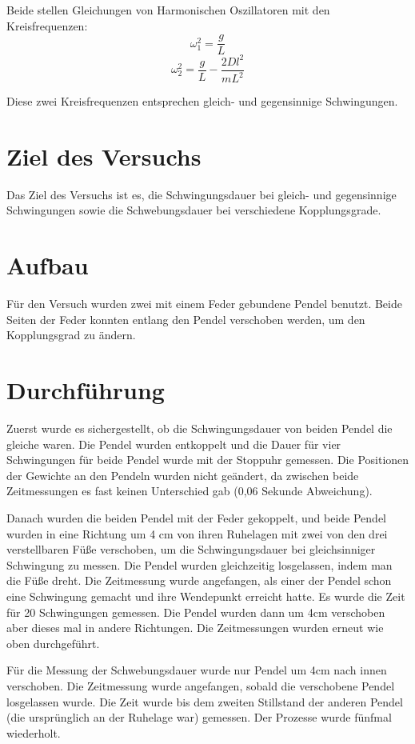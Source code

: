 \documentclass[11pt,a4paper]{article}
\begin{document}
Beide stellen Gleichungen von Harmonischen Oszillatoren mit den Kreisfrequenzen:
$$ \omega_1^2 = \frac{g}{L}$$
$$ \omega_2^2 = \frac{g}{L}-\frac{2Dl^2}{mL^2} $$

Diese zwei Kreisfrequenzen entsprechen gleich- und gegensinnige Schwingungen. 

\section{Ziel des Versuchs}
Das Ziel des Versuchs ist es, die Schwingungsdauer bei gleich- und gegensinnige Schwingungen sowie die Schwebungsdauer bei verschiedene Kopplungsgrade. 


\section{Aufbau}
Für den Versuch wurden zwei mit einem Feder gebundene Pendel benutzt. Beide Seiten der Feder konnten entlang den Pendel verschoben werden, um den Kopplungsgrad zu ändern. 

\section{Durchführung}
Zuerst wurde es sichergestellt, ob die Schwingungsdauer von beiden Pendel die gleiche waren. Die Pendel wurden entkoppelt und die Dauer für vier Schwingungen für beide Pendel wurde mit der Stoppuhr gemessen. Die Positionen der Gewichte an den Pendeln wurden nicht geändert, da zwischen beide Zeitmessungen es fast keinen Unterschied gab (0,06 Sekunde Abweichung).

Danach wurden die beiden Pendel mit der Feder gekoppelt, und beide Pendel wurden in eine Richtung um 4 cm von ihren Ruhelagen mit zwei von den drei verstellbaren Füße verschoben, um die Schwingungsdauer bei gleichsinniger Schwingung zu messen. Die Pendel wurden gleichzeitig losgelassen, indem man die Füße dreht. Die Zeitmessung wurde angefangen, als einer der Pendel schon eine Schwingung gemacht und ihre Wendepunkt erreicht hatte. Es wurde die Zeit für 20 Schwingungen gemessen. Die Pendel wurden dann um 4cm verschoben aber dieses mal in andere Richtungen. Die Zeitmessungen wurden erneut wie oben durchgeführt. 

Für die Messung der Schwebungsdauer wurde nur Pendel um 4cm nach innen verschoben. Die Zeitmessung wurde angefangen, sobald die verschobene Pendel losgelassen wurde. Die Zeit wurde bis dem zweiten Stillstand der anderen Pendel (die ursprünglich an der Ruhelage war) gemessen. Der Prozesse wurde fünfmal wiederholt. 
\end{document}
